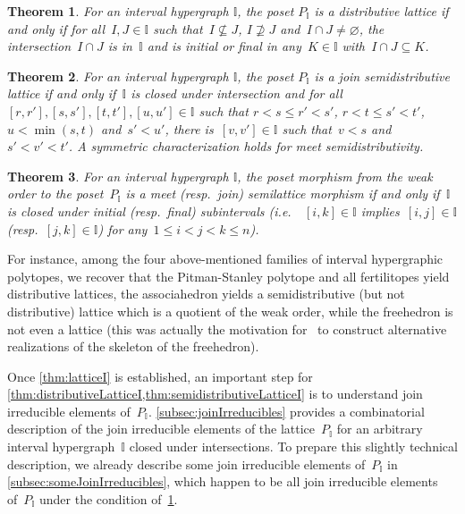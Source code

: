\documentclass{amsart}
\newtheorem{theoremA}{Theorem}
\theoremstyle{definition}
\newcommand{\ie}{\textit{i.e.}~} %
\newcommand{\II}{\mathbb I} %
\begin{document}
\begin{theoremA}
\label{thm:distributiveLatticeI}
For an interval hypergraph $\II$, the poset $P_\II$ is a distributive lattice if and only if for all~$I, J \in \II$ such that~$I \not\subseteq J$, $I \not\supseteq J$ and~$I \cap J \ne \varnothing$, the intersection~$I \cap J$ is in~$\II$ and is initial or final in any~$K \in \II$ with~$I \cap J \subseteq K$.
\end{theoremA}

\begin{theoremA}
\label{thm:semidistributiveLatticeI}
For an interval hypergraph $\II$, the poset $P_\II$ is a join semidistributive lattice if and only if~$\II$ is closed under intersection and for all~$[r,r'], [s,s'], [t,t'], [u,u'] \in \II$ such that ${r < s \le r' < s'}$, $r < t \le s' < t'$, $u < \min(s, t)$ and~$s' < u'$, there is~$[v,v'] \in \II$ such that~$v < s$ and~${s' < v' < t'}$.
A symmetric characterization holds for meet semidistributivity.
\end{theoremA}

\begin{theoremA}
\label{thm:quotientLatticeI}
For an interval hypergraph $\II$, the poset morphism from the weak order to the poset~$P_\II$ is a meet (resp.~join) semilattice morphism if and only if~$\II$ is closed under initial (resp.~final) subintervals (\ie~$[i,k] \in \II$ implies~$[i,j] \in \II$ (resp.~$[j,k] \in \II$) for any~$1 \le i < j < k \le n$).
\end{theoremA}

For instance, among the four above-mentioned families of interval hypergraphic polytopes, we recover that  the Pitman-Stanley polytope and all fertilitopes yield distributive lattices, the associahedron yields a semidistributive (but not distributive) lattice which is a quotient of the weak order, while the freehedron is not even a lattice (this was actually the motivation for~\cite{PilaudPoliakova} to construct alternative realizations of the skeleton of the freehedron).

Once \cref{thm:latticeI} is established, an important step for \cref{thm:distributiveLatticeI,thm:semidistributiveLatticeI} is to understand join irreducible elements of~$P_\II$.
\cref{subsec:joinIrreducibles} provides a combinatorial description of the join irreducible elements of the lattice~$P_\II$ for an arbitrary interval hypergraph~$\II$ closed under intersections.
To prepare this slightly technical description, we already describe some join irreducible elements of~$P_\II$ in \cref{subsec:someJoinIrreducibles}, which happen to be all join irreducible elements of~$P_\II$ under the condition of~\cref{thm:distributiveLatticeI}.
\end{document}
